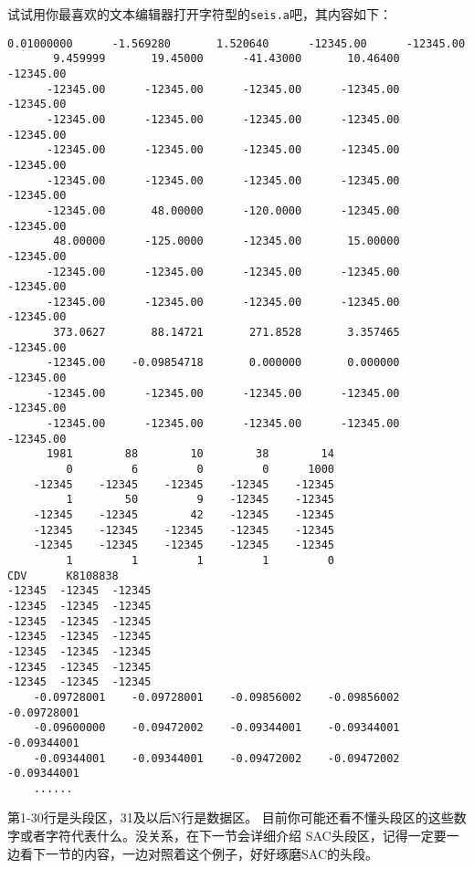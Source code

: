 试试用你最喜欢的文本编辑器打开字符型的\lstinline{seis.a}吧，其内容如下：
\begin{lstlisting}[style=Bash]
     0.01000000      -1.569280       1.520640      -12345.00      -12345.00
       9.459999       19.45000      -41.43000       10.46400      -12345.00
      -12345.00      -12345.00      -12345.00      -12345.00      -12345.00
      -12345.00      -12345.00      -12345.00      -12345.00      -12345.00
      -12345.00      -12345.00      -12345.00      -12345.00      -12345.00
      -12345.00      -12345.00      -12345.00      -12345.00      -12345.00
      -12345.00       48.00000      -120.0000      -12345.00      -12345.00
       48.00000      -125.0000      -12345.00       15.00000      -12345.00
      -12345.00      -12345.00      -12345.00      -12345.00      -12345.00
      -12345.00      -12345.00      -12345.00      -12345.00      -12345.00
       373.0627       88.14721       271.8528       3.357465      -12345.00
      -12345.00    -0.09854718       0.000000       0.000000      -12345.00
      -12345.00      -12345.00      -12345.00      -12345.00      -12345.00
      -12345.00      -12345.00      -12345.00      -12345.00      -12345.00
      1981        88        10        38        14  
         0         6         0         0      1000
    -12345    -12345    -12345    -12345    -12345
         1        50         9    -12345    -12345
    -12345    -12345        42    -12345    -12345
    -12345    -12345    -12345    -12345    -12345
    -12345    -12345    -12345    -12345    -12345
         1         1         1         1         0   
CDV      K8108838    
-12345  -12345  -12345  
-12345  -12345  -12345  
-12345  -12345  -12345  
-12345  -12345  -12345  
-12345  -12345  -12345  
-12345  -12345  -12345  
-12345  -12345  -12345  
    -0.09728001    -0.09728001    -0.09856002    -0.09856002    -0.09728001
    -0.09600000    -0.09472002    -0.09344001    -0.09344001    -0.09344001
    -0.09344001    -0.09344001    -0.09472002    -0.09472002    -0.09344001
    ......
\end{lstlisting}

第1-30行是头段区，31及以后N行是数据区。
目前你可能还看不懂头段区的这些数字或者字符代表什么。没关系，在下一节会详细介绍
SAC头段区，记得一定要一边看下一节的内容，一边对照着这个例子，好好琢磨SAC的头段。
